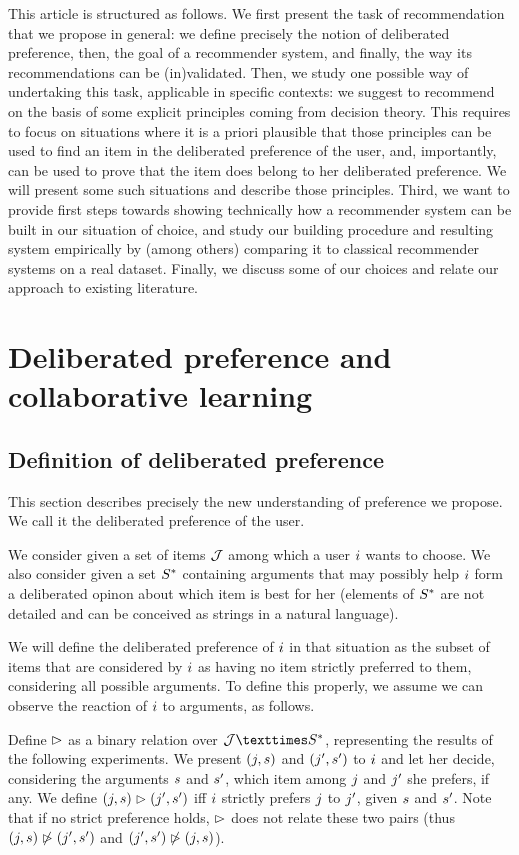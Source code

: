 \documentclass[french, english]{da2pl2018}
\begin{document}
This article is structured as follows. We first present the task of recommendation that we propose in general: we define precisely the notion of deliberated preference, then, the goal of a recommender system, and finally, the way its recommendations can be (in)validated. Then, we study one possible way of undertaking this task, applicable in specific contexts: we suggest to recommend on the basis of some explicit principles coming from decision theory. This requires to focus on situations where it is a priori plausible that those principles can be used to find an item in the deliberated preference of the user, and, importantly, can be used to prove that the item does belong to her deliberated preference. We will present some such situations and describe those principles. Third, we want to provide first steps towards showing technically how a recommender system can be built in our situation of choice, and study our building procedure and resulting system empirically by (among others) comparing it to classical recommender systems on a real dataset. Finally, we discuss some of our choices and relate our approach to existing literature.

\section{Deliberated preference and collaborative learning}
\subsection{Definition of deliberated preference}
This section describes precisely the new understanding of preference we propose. We call it the deliberated preference of the user.

We consider given a set of items $\mathcal{J}$ among which a user $i$ wants to choose. We also consider given a set $S^*$ containing arguments that may possibly help $i$ form a deliberated opinon about which item is best for her (elements of $S^*$ are not detailed and can be conceived as strings in a natural language). 

We will define the deliberated preference of $i$ in that situation as the subset of items that are considered by $i$ as having no item strictly preferred to them, considering all possible arguments. To define this properly, we assume we can observe the reaction of $i$ to arguments, as follows. 

Define $\vartriangleright$ as a binary relation over $\allitems × \allargs$, representing the results of the following experiments. We present $(j, s)$ and $(j', s')$ to $i$ and let her decide, considering the arguments $s$ and $s'$, which item among $j$ and $j'$ she prefers, if any. 
We define $(j, s) \vartriangleright (j', s')$ iff $i$ strictly prefers $j$ to $j'$, given $s$ and $s'$. Note that if no strict preference holds, $\vartriangleright$ does not relate these two pairs (thus $(j, s) \not\vartriangleright (j', s')$ and $(j', s') \not\vartriangleright (j, s)$). 
\end{document}
